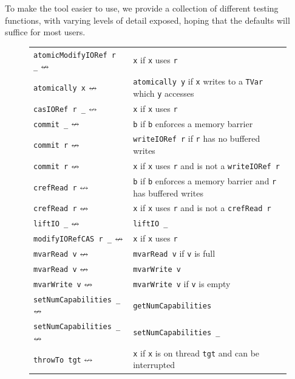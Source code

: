 To make the tool easier to use, we provide a collection of different
testing functions, with varying levels of detail exposed, hoping that
the defaults will suffice for most users.
\begin{figure}
  \centering
  \footnotesize
  \begin{tabular}{R{4cm}@{\hspace{0.5em}}L{8cm}}
    \texttt{atomicModifyIORef r \_} $\nleftrightarrow$& \texttt{x}
      \hfill if \texttt{x} uses \texttt{r} \\
    \texttt{atomically x} $\nleftrightarrow$& \texttt{atomically y}
      \hfill if \texttt{x} writes to a \texttt{TVar} which \texttt{y} accesses \\
    \texttt{casIORef r \_} $\nleftrightarrow$& \texttt{x}
      \hfill if \texttt{x} uses \texttt{r} \\
    \texttt{commit \_} $\nleftrightarrow$& \texttt{b}
      \hfill if \texttt{b} enforces a memory barrier \\
    \texttt{commit r} $\nleftrightarrow$& \texttt{writeIORef r}
      \hfill if \texttt{r} has no buffered writes \\
    \texttt{commit r} $\nleftrightarrow$& \texttt{x}
      \hfill if \texttt{x} uses \texttt{r} and is not a \texttt{writeIORef r} \\
    \texttt{crefRead r} $\nleftrightarrow$& \texttt{b}
      \hfill if \texttt{b} enforces a memory barrier and \texttt{r} has buffered writes \\
    \texttt{crefRead r} $\nleftrightarrow$& \texttt{x}
      \hfill if \texttt{x} uses \texttt{r} and is not a \texttt{crefRead r} \\
    \texttt{liftIO \_} $\nleftrightarrow$& \texttt{liftIO \_} \\
    \texttt{modifyIORefCAS r \_} $\nleftrightarrow$& \texttt{x}
      \hfill if \texttt{x} uses \texttt{r} \\
    \texttt{mvarRead v} $\nleftrightarrow$& \texttt{mvarRead v}
      \hfill if \texttt{v} is full \\
    \texttt{mvarRead v} $\nleftrightarrow$& \texttt{mvarWrite v} \\
    \texttt{mvarWrite v} $\nleftrightarrow$& \texttt{mvarWrite v}
      \hfill if \texttt{v} is empty \\
    \texttt{setNumCapabilities \_} $\nleftrightarrow$& \texttt{getNumCapabilities} \\
    \texttt{setNumCapabilities \_} $\nleftrightarrow$& \texttt{setNumCapabilities \_} \\
    \texttt{throwTo tgt} $\nleftrightarrow$& \texttt{x}
      \hfill if \texttt{x} is on thread \texttt{tgt} and can be interrupted \\

\end{tabular}
\end{figure}
